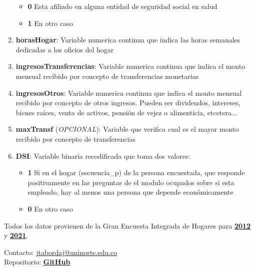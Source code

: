 \documentclass[12pt,a4paper]{article}
\begin{document}
\begin{enumerate}
		\begin{itemize}
			\item \textbf{0} Esta afiliado en alguna entidad de seguridad social en salud
			\item \textbf{1} En otro caso
		\end{itemize}
		\item \textbf{horasHogar}: Variable numerica continua que indica las horas semanales dedicadas a los oficios del hogar
		\item \textbf{ingresosTransferencias}: Variable numerica continua que indica el monto mensual recibido por concepto de transferencias monetarias
		\item \textbf{ingresosOtros}: Variable numerica continua que indica el monto mensual recibido por concepto de otros ingresos. Pueden ser dividendos, intereses, bienes raíces, venta de activos, pensión de vejez o alimenticia, etcetera...
		\item \textbf{maxTransf} (\textit{OPCIONAL}): Variable que verifica cual es el mayor monto recibido por concepto de transferencias
		\item \textbf{DSI}: Variable binaria recodificada que toma dos valores:
		\begin{itemize}
			\item \textbf{1} Si en el hogar (secuencia\_p) de la persona encuestada, que responde positivamente en las preguntas de el modulo ocupados sobre si esta empleado, hay al menos una persona que depende económicamente
			\item \textbf{0} En otro caso
		\end{itemize}
\end{enumerate}

Todos los datos provienen de la Gran Encuesta Integrada de Hogares para \textbf{\href{https://microdatos.dane.gov.co/index.php/catalog/77/study-description}{2012}} y  \textbf{\href{https://microdatos.dane.gov.co/index.php/catalog/701/study-description}{2021}}.

\vfill

\noindent Contacto: \href{mailto:jtabordaj@uninorte.edu.co}{jtabordaj@uninorte.edu.co} \\
Repositorio: \textbf{\href{https://github.com/jtabordaj/research_perilla}{GitHub}}
\end{document}
